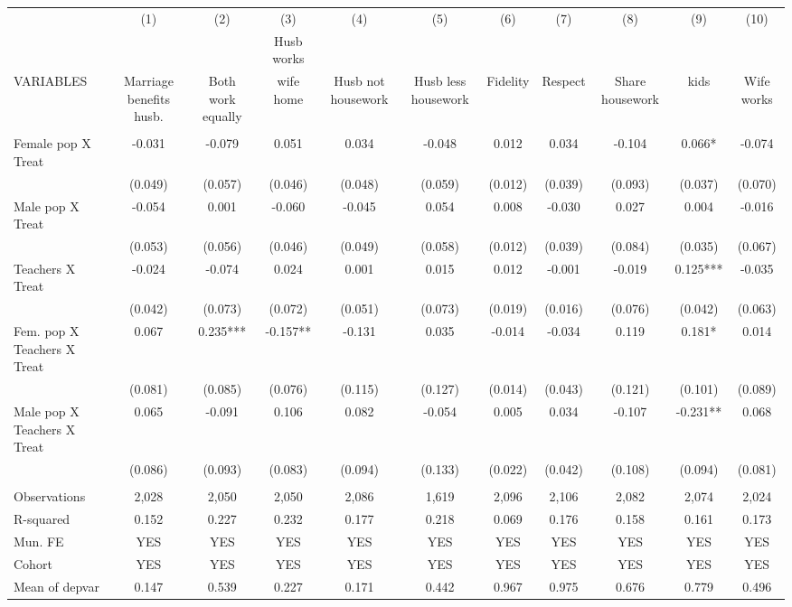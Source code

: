 \begin{tabular}{lcccccccccc} \hline
 & (1) & (2) & (3) & (4) & (5) & (6) & (7) & (8) & (9) & (10) \\
 &  &  & Husb works &  &  &  &  &  &  &  \\
VARIABLES & Marriage benefits husb. & Both work equally & wife home & Husb not housework & Husb less housework & Fidelity & Respect & Share housework & kids & Wife works \\ \hline
 &  &  &  &  &  &  &  &  &  &  \\
Female pop X Treat & -0.031 & -0.079 & 0.051 & 0.034 & -0.048 & 0.012 & 0.034 & -0.104 & 0.066* & -0.074 \\
 & (0.049) & (0.057) & (0.046) & (0.048) & (0.059) & (0.012) & (0.039) & (0.093) & (0.037) & (0.070) \\
Male pop X Treat & -0.054 & 0.001 & -0.060 & -0.045 & 0.054 & 0.008 & -0.030 & 0.027 & 0.004 & -0.016 \\
 & (0.053) & (0.056) & (0.046) & (0.049) & (0.058) & (0.012) & (0.039) & (0.084) & (0.035) & (0.067) \\
Teachers X Treat & -0.024 & -0.074 & 0.024 & 0.001 & 0.015 & 0.012 & -0.001 & -0.019 & 0.125*** & -0.035 \\
 & (0.042) & (0.073) & (0.072) & (0.051) & (0.073) & (0.019) & (0.016) & (0.076) & (0.042) & (0.063) \\
Fem. pop X Teachers X Treat & 0.067 & 0.235*** & -0.157** & -0.131 & 0.035 & -0.014 & -0.034 & 0.119 & 0.181* & 0.014 \\
 & (0.081) & (0.085) & (0.076) & (0.115) & (0.127) & (0.014) & (0.043) & (0.121) & (0.101) & (0.089) \\
Male pop X Teachers X Treat & 0.065 & -0.091 & 0.106 & 0.082 & -0.054 & 0.005 & 0.034 & -0.107 & -0.231** & 0.068 \\
 & (0.086) & (0.093) & (0.083) & (0.094) & (0.133) & (0.022) & (0.042) & (0.108) & (0.094) & (0.081) \\
 &  &  &  &  &  &  &  &  &  &  \\
Observations & 2,028 & 2,050 & 2,050 & 2,086 & 1,619 & 2,096 & 2,106 & 2,082 & 2,074 & 2,024 \\
R-squared & 0.152 & 0.227 & 0.232 & 0.177 & 0.218 & 0.069 & 0.176 & 0.158 & 0.161 & 0.173 \\
Mun. FE & YES & YES & YES & YES & YES & YES & YES & YES & YES & YES \\
Cohort & YES & YES & YES & YES & YES & YES & YES & YES & YES & YES \\
 Mean of depvar & 0.147 & 0.539 & 0.227 & 0.171 & 0.442 & 0.967 & 0.975 & 0.676 & 0.779 & 0.496 \\ \hline
\end{tabular}
